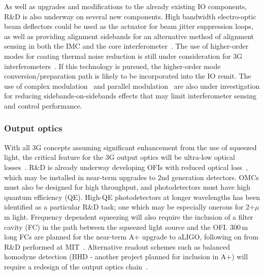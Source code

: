 As well as upgrades and modifications to the already existing IO components, R\&D is also underway on several new components. High bandwidth electro-optic beam deflectors could be used as the actuator for beam jitter suppression loops, as well as providing alignment sidebands for an alternative method of alignment sensing in both the IMC and the core interferometer~\cite{RFJASC}. The use of higher-order modes for coating thermal noise reduction is still under consideration for 3G interferometers~\cite{LGmodes}. If this technology is pursued, the higher-order mode conversion/preparation path is likely to be incorporated into the IO remit. 
The use of complex modulation~\cite{complexmod} and parallel modulation~\cite{kagraMZI} are also under investigation for reducing sidebands-on-sidebands effects that may limit interferometer sensing and control performance.

\subsubsection{Output optics}
With all 3G concepts assuming significant enhancement from the use of squeezed light, the critical feature for the 3G output optics will be ultra-low optical losses~\cite{squeeze_lossbudget}. R\&D is already underway developing OFIs with reduced optical loss~\cite{EGOLLFI,UFLLFI}, which may be installed in near-term upgrades to 2nd generation detectors. OMCs must also be designed for high throughput, and photodetectors must have high quantum efficiency (QE). High-QE photodetectors at longer wavelengths has been identified as a particular R\&D task; one which may be especially onerous for 2+$\mu$m light. Frequency dependent squeezing will also require the inclusion of a filter cavity (FC) in the path between the squeezed light source and the OFI. 300\,m long FCs are planned for the near-term A+ upgrade to aLIGO, following on from R\&D performed at MIT~\cite{MITFC}. Alternative readout schemes such as balanced homodyne detection (BHD - another project planned for inclusion in A+) will require a redesign of the output optics chain~\cite{BHD}.


